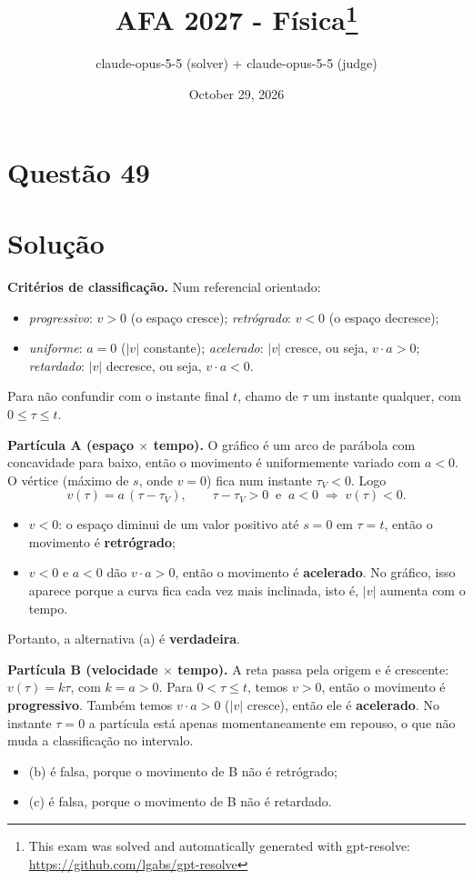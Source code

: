\documentclass{article}%
\title{AFA 2027 - Física\thanks{This exam was solved and automatically generated with gpt-resolve: \url{https://github.com/lgabs/gpt-resolve}}}%
\author{claude{-}opus{-}5{-}5 (solver) + claude{-}opus{-}5{-}5 (judge)}%
\date{October 29, 2026}%
\begin{document}
%
\normalsize%
\maketitle%
\section*{Questão 49}

\section*{Solução}

\textbf{Critérios de classificação.} Num referencial orientado:
\begin{itemize}
\item \emph{progressivo}: $v>0$ (o espaço cresce); \emph{retrógrado}: $v<0$ (o espaço decresce);
\item \emph{uniforme}: $a=0$ ($|v|$ constante); \emph{acelerado}: $|v|$ cresce, ou seja, $v\cdot a>0$; \emph{retardado}: $|v|$ decresce, ou seja, $v\cdot a<0$.
\end{itemize}
Para não confundir com o instante final $t$, chamo de $\tau$ um instante qualquer, com $0\le\tau\le t$.

\textbf{Partícula A (espaço $\times$ tempo).} O gráfico é um arco de parábola com concavidade para baixo, então o movimento é uniformemente variado com $a<0$. O vértice (máximo de $s$, onde $v=0$) fica num instante $\tau_V<0$. Logo
\[
v(\tau)=a\,(\tau-\tau_V),\qquad \tau-\tau_V>0 \ \text{ e } \ a<0 \;\Rightarrow\; v(\tau)<0 .
\]
\begin{itemize}
\item $v<0$: o espaço diminui de um valor positivo até $s=0$ em $\tau=t$, então o movimento é \textbf{retrógrado};
\item $v<0$ e $a<0$ dão $v\cdot a>0$, então o movimento é \textbf{acelerado}. No gráfico, isso aparece porque a curva fica cada vez mais inclinada, isto é, $|v|$ aumenta com o tempo.
\end{itemize}
Portanto, a alternativa (a) é \textbf{verdadeira}.

\textbf{Partícula B (velocidade $\times$ tempo).} A reta passa pela origem e é crescente: $v(\tau)=k\tau$, com $k=a>0$. Para $0<\tau\le t$, temos $v>0$, então o movimento é \textbf{progressivo}. Também temos $v\cdot a>0$ ($|v|$ cresce), então ele é \textbf{acelerado}. No instante $\tau=0$ a partícula está apenas momentaneamente em repouso, o que não muda a classificação no intervalo.
\begin{itemize}
\item (b) é falsa, porque o movimento de B não é retrógrado;
\item (c) é falsa, porque o movimento de B não é retardado.
\end{itemize}
\end{document}
